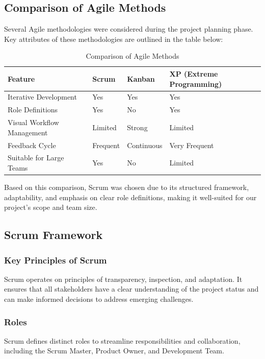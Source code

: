 \subsection{Comparison of Agile Methods}
Several Agile methodologies were considered during the project planning phase. Key attributes of these methodologies are outlined in the table below:

\begin{table}[h!]
    \centering
    \caption{Comparison of Agile Methods}
    \begin{tabular}{|l|l|l|l|}
        \hline
        \textbf{Feature} & \textbf{Scrum} & \textbf{Kanban} & \textbf{XP (Extreme Programming)} \\
        \hline
        Iterative Development & Yes & Yes & Yes \\
        Role Definitions & Yes & No & Yes \\
        Visual Workflow Management & Limited & Strong & Limited \\
        Feedback Cycle & Frequent & Continuous & Very Frequent \\
        Suitable for Large Teams & Yes & No & Limited \\
        \hline
    \end{tabular}
\end{table}

Based on this comparison, Scrum was chosen due to its structured framework, adaptability, and emphasis on clear role definitions, making it well-suited for our project's scope and team size.

\subsection{Scrum Framework}
\subsubsection{Key Principles of Scrum}
Scrum operates on principles of transparency, inspection, and adaptation. It ensures that all stakeholders have a clear understanding of the project status and can make informed decisions to address emerging challenges.

\subsubsection{Roles}
Scrum defines distinct roles to streamline responsibilities and collaboration, including the Scrum Master, Product Owner, and Development Team.

